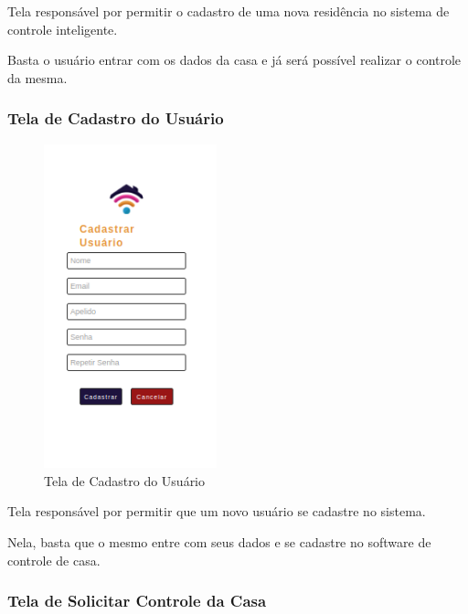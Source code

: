 \par Tela responsável por permitir o cadastro de uma nova residência no sistema de controle inteligente.
\par Basta o usuário entrar com os dados da casa e já será possível realizar o controle da mesma.

\subsubsection{Tela de Cadastro do Usuário}

\begin{figure}[!h]
\centering
\caption{Tela de Cadastro do Usuário}
\includegraphics[width=5cm]{figuras/cadastro_de_usuario}
\end{figure}

\par Tela responsável por permitir que um novo usuário se cadastre no sistema.
\par Nela, basta que o mesmo entre com seus dados e se cadastre no software de controle de casa.

\subsubsection{Tela de Solicitar Controle da Casa}

